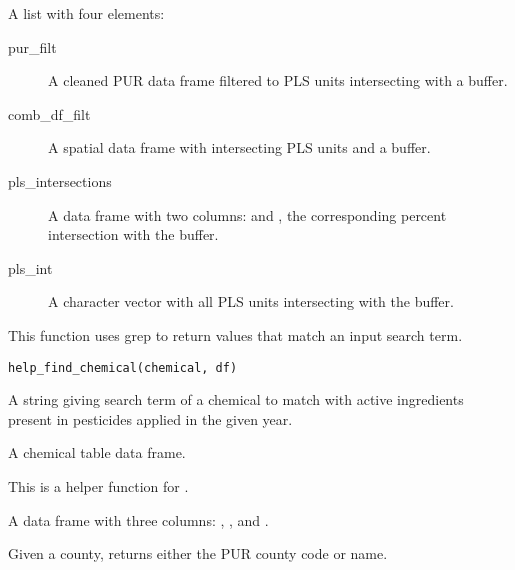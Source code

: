 \documentclass[a4paper]{book}
\begin{document}
\begin{Value}
A list with four elements:
\begin{description}

\item[pur\_filt] A cleaned PUR data frame filtered to PLS units intersecting
with a buffer.
\item[comb\_df\_filt] A spatial data frame with intersecting PLS units and
a buffer.
\item[pls\_intersections] A data frame with two columns:  and
, the corresponding percent intersection with the buffer.
\item[pls\_int] A character vector with all PLS units intersecting with the
buffer.

\end{description}

\end{Value}
%
\begin{Description}\relax
This function uses grep to return  values that match an input
search term.
\end{Description}
%
\begin{Usage}
\begin{verbatim}
help_find_chemical(chemical, df)
\end{verbatim}
\end{Usage}
%
\begin{Arguments}
\begin{ldescription}
\item[\code{chemical}] A string giving search term of a
chemical to match with active ingredients present in pesticides applied
in the given year.

\item[\code{df}] A chemical table data frame.
\end{ldescription}
\end{Arguments}
%
\begin{Details}\relax
This is a helper function for .
\end{Details}
%
\begin{Value}
A data frame with three columns: , ,
and .
\end{Value}
%
\begin{Description}\relax
Given a county,  returns either the PUR
county code or name.
\end{Description}
\end{document}
